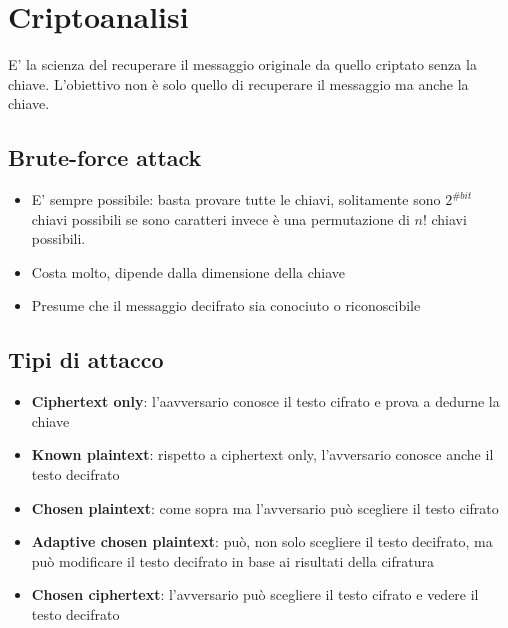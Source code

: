 \documentclass[12pt, a4paper]{report}
\begin{document}
\section{Criptoanalisi}
E' la scienza del recuperare il messaggio originale da quello criptato senza la chiave. L'obiettivo non è solo quello di recuperare il messaggio ma anche la chiave.
\subsection{Brute-force attack}
\begin{itemize}
    \item E' sempre possibile: basta provare tutte le chiavi, solitamente sono $2^{\#bit}$ chiavi possibili se sono caratteri invece è una permutazione di $n!$ chiavi possibili.
    \item Costa molto, dipende dalla dimensione della chiave
    \item Presume che il messaggio decifrato sia conociuto o riconoscibile
\end{itemize}
\subsection{Tipi di attacco}
\begin{itemize}
    \item \textbf{Ciphertext only}: l'aavversario conosce il testo cifrato e prova a dedurne la chiave
    \item \textbf{Known plaintext}: rispetto a ciphertext only, l'avversario conosce anche il testo decifrato
    \item \textbf{Chosen plaintext}: come sopra ma l'avversario può scegliere il testo cifrato
    \item \textbf{Adaptive chosen plaintext}: può, non solo scegliere il testo decifrato, ma può modificare il testo decifrato in base ai risultati della cifratura
    \item \textbf{Chosen ciphertext}: l'avversario può scegliere il testo cifrato e vedere il testo decifrato
\end{itemize}
\end{document}
